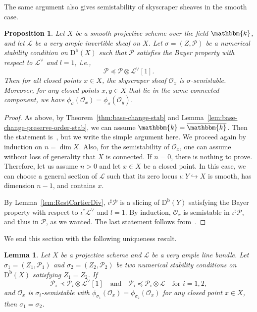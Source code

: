 \documentclass[11pt, reqno]{amsart}
\numberwithin{equation}{section}
\theoremstyle{plain}
\newtheorem{lemma}[theorem]{Lemma}
\newtheorem{proposition}[theorem]{Proposition}
\theoremstyle{remark}
\theoremstyle{definition}
\theoremstyle{italicsname}
\newcommand{\Db}{\mathrm{D^b}}
\newcommand{\cO}{\mathcal{O}}
\newcommand{\cL}{\mathcal{L}}
\newcommand{\cP}{\mathscr{P}}
\newcommand{\KK}{\mathbbm{k}}
\begin{document}
The same argument also gives semistability of skyscraper sheaves in the smooth case.

\begin{proposition}\label{prop:BayerGeometric}
Let $X$ be a smooth projective scheme over the field $\KK$, and let $\cL$ be a very ample invertible sheaf on $X$.
Let $\sigma=(Z,\cP)$ be a numerical stability condition on $\Db(X)$ such that $\cP$ satisfies the Bayer property with respect to $\cL^\vee$ and $l=1$, i.e.,
\[
\cP\preceq\cP\otimes\cL^\vee[1].
\]
Then for all closed points $x\in X$, the skyscraper sheaf  $\cO_x$ is $\sigma$-semistable. Moreover, for any closed points $x,y\in X$ that lie in the same connected component, we have $\phi_{\sigma}(\cO_x)=\phi_{\sigma}(\cO_y)$. 
\end{proposition}

\begin{proof}
As above, by Theorem~\ref{thm:base-change-stab} and Lemma~\ref{lem:base-change-preserve-order-stab}, we can assume $\KK=\overline{\KK}$.
Then the statement is~\cite[Corollary 6.10]{Li:sb}, but we write the simple argument here.
We proceed again by induction on $n=\dim{X}$. Also, for the semistability of $\cO_x$, one can assume without loss of generality that $X$ is connected. If $n=0$, there is nothing to prove.
Therefore, let us assume $n>0$ and let $x\in X$ be a closed point.
In this case, we can choose a general section of $\cL$ such that its zero locus $\iota\colon Y\hookrightarrow X$ is smooth, has dimension $n-1$, and contains $x$. 

By Lemma~\ref{lem:RestCartierDiv}, $\iota^\sharp\cP$ is a slicing of $\Db(Y)$ satisfying the Bayer property with respect to $\iota^*\cL^\vee$ and $l=1$.
By induction, $\cO_x$ is semistable in $\iota^\sharp\cP$, and thus in $\cP$, as we wanted. 
The last statement follows from~\cite[Proposition 2.9]{FLZ:Albanese}.
\end{proof}

We end this section with the following uniqueness result.

\begin{lemma}\label{lem:unique-general}
Let $X$ be a projective scheme and $\cL$ be a very ample line bundle. 
Let $\sigma_1=(Z_1, \cP_1)$ and $\sigma_2=(Z_2, \cP_2)$ be two numerical stability conditions on $\Db(X)$ satisfying $Z_{1}=Z_{2}$. 
If 
\[
\cP_i\prec\cP_i\otimes\cL^{\vee}[1] \quad \text{and} \quad \cP_i\preceq\cP_i\otimes\cL \quad \text{for } i=1,2,
\]
and $\cO_x$ is $\sigma_i$-semistable with $\phi_{\sigma_1}(\cO_x)=\phi_{\sigma_2}(\cO_x)$ for any closed point $x\in X$, then $\sigma_1=\sigma_2$.
\end{lemma}
\end{document}
